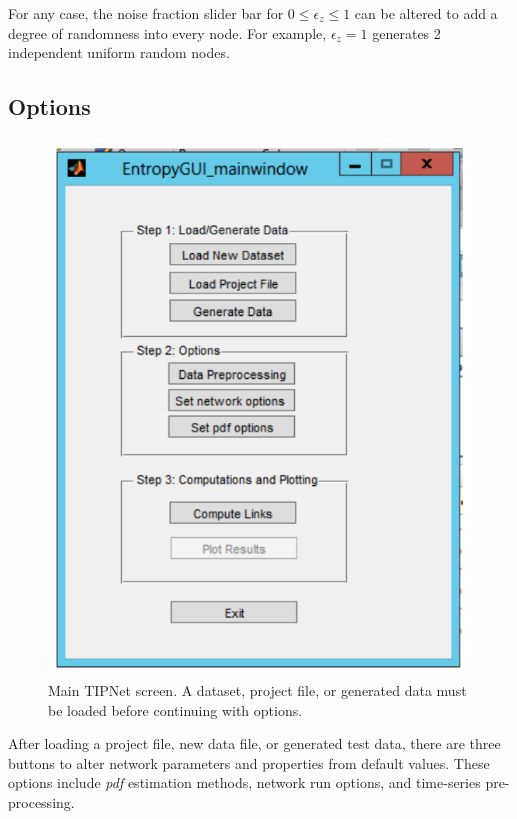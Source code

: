 \documentclass[a4paper]{article}
\begin{document}
For any case, the noise fraction slider bar for $0 \le \epsilon_z \le 1$ can be altered to add a degree of randomness into every node.  For example, $\epsilon_z =1$ generates 2 independent uniform random nodes.  

\subsection{Options}

\begin{figure}[h!]\label{fig:start}
\begin{center}
\includegraphics[scale=.5]{Image_Main_PreComputeLinks.pdf}
\caption{Main TIPNet screen.  A dataset, project file, or generated data must be loaded before continuing with options.}
\end{center}
\end{figure}

After loading a project file, new data file, or generated test data, there are three buttons to alter network parameters and properties from default values.  These options include \textit{pdf} estimation methods, network run options, and time-series pre-processing.
\end{document}
